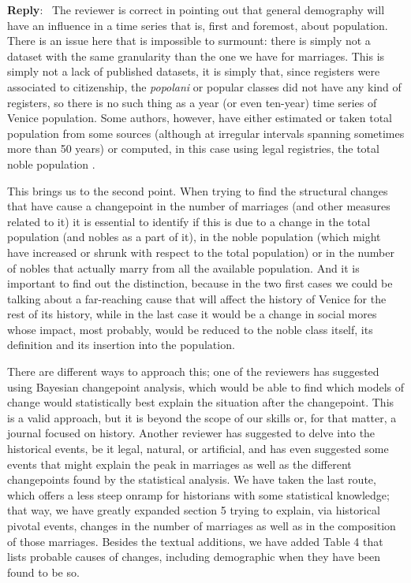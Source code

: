 \documentclass[11pt]{article}
\newcounter{reviewer}
\newcounter{point}[reviewer]
\newenvironment{reply}
   {\medskip \noindent \begin{sf}\textbf{Reply}:\  }
   {\medskip \end{sf}}
\begin{document}
\begin{reply}
  The reviewer is correct in pointing out that general demography will have an
  influence in a time series that is, first and foremost, about
  population. There is an issue here that is impossible to surmount: there is
  simply not a dataset with the same granularity than the one we have for
  marriages. This is simply not a lack of published datasets, it is simply that,
  since registers were associated to citizenship, the {\em popolani} or popular
  classes did not have any kind of registers, so there is no such thing as a
  year (or even ten-year) time series of Venice population. Some authors,
  however, have either estimated or taken total population from some sources
  \cite{davis1962decline} (although at irregular intervals spanning sometimes
  more than 50 years) or computed, in this case using legal registries, the
  total noble population \cite{raines2013rameau}.

  This brings us to the second point. When trying to find the structural changes
  that have cause a changepoint in the number of marriages (and other measures
  related to it) it is essential to identify if this is due to a change in the
  total population (and nobles as a part of it), in the noble population (which
  might have increased or shrunk with respect to the total population) or in the
  number of nobles that actually marry from all the available population. And it
  is important to find out the distinction, because in the two first cases we
  could be talking about a far-reaching cause that will affect the history of
  Venice for the rest of its history, while in the last case it would be a
  change in social mores whose impact, most probably, would be reduced to the
  noble class itself, its definition and its insertion into the population.

  There are different ways to approach this; one of the reviewers has suggested
  using Bayesian changepoint analysis, which would be able to find which models
  of change would statistically best explain the situation after the
  changepoint. This is a valid approach, but it is beyond the scope of our
  skills or, for that matter, a journal focused on history. Another reviewer has
  suggested to delve into the historical events, be it legal, natural, or
  artificial, and has even suggested some events that might explain the peak in
  marriages as well as the different changepoints found by the statistical
  analysis. We have taken the last route, which offers a less steep onramp for
  historians with some statistical knowledge; that way, we have greatly expanded
  section 5 trying to explain, via historical pivotal events, changes in the
  number of marriages as well as in the composition of those marriages. Besides
  the textual additions, we have added Table 4 that lists probable causes of
  changes, including demographic when they have been found to be so.
\end{reply}
\end{document}
